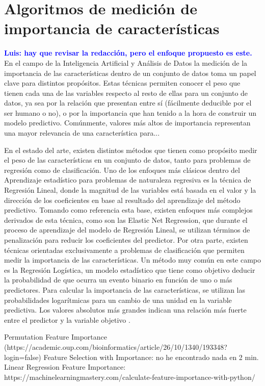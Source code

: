 \documentclass{uathesis-es}
\begin{document}
\section{Algoritmos de medición de importancia de características}
\label{SOAT_FEATURE_IMPORTANCE_METHODS}

\textcolor{blue}{\textbf{Luis: hay que revisar la redacción, pero el enfoque propuesto es este.}}\\


En el campo de la Inteligencia Artificial y Análisis de Datos la medición de la importancia de las características dentro de un conjunto de datos toma un papel clave para distintos propósitos. Estas técnicas permiten conocer el peso que tienen cada una de las variables respecto al resto de ellas para un conjunto de datos, ya sea por la relación que presentan entre sí (fácilmente deducible por el ser humano o no), o por la importancia que han tenido a la hora de construir un modelo predictivo. Comúnmente, valores más altos de importancia representan una mayor relevancia de una característica para...

En el estado del arte, existen distintos métodos que tienen como propósito medir el peso de las características en un conjunto de datos, tanto para problemas de regresión como de clasificación. Uno de los enfoques más clásicos dentro del Aprendizaje estadístico para problemas de naturaleza regresiva es la técnica de Regresión Lineal, donde la magnitud de las variables está basada en el valor y la dirección de los coeficientes en base al resultado del aprendizaje del método predictivo. Tomando como referencia esta base, existen enfoques más complejos derivados de esta técnica, como son las Elastic Net Regression, que durante el proceso de aprendizaje del modelo de Regresión Lineal, se utilizan términos de penalización para reducir los coeficientes del predictor. Por otra parte, existen técnicas orientadas exclusivamente a problemas de clasificación que permiten medir la importancia de las características. Un método muy común en este campo es la Regresión Logística, un modelo estadístico que tiene como objetivo deducir la probabilidad de que ocurra un evento binario en función de uno o más predictores. Para calcular la importancia de las características, se utilizan las probabilidades logarítmicas para un cambio de una unidad en la variable predictiva. Los valores absolutos más grandes indican una relación más fuerte entre el predictor y la variable objetivo \cite{Saarela2021}.

Permutation Feature Importance (https://academic.oup.com/bioinformatics/article/26/10/1340/193348?login=false)
Feature Selection with Importance: no he encontrado nada en 2 min.\\
Linear Regression Feature Importance: https://machinelearningmastery.com/calculate-feature-importance-with-python/
\end{document}
